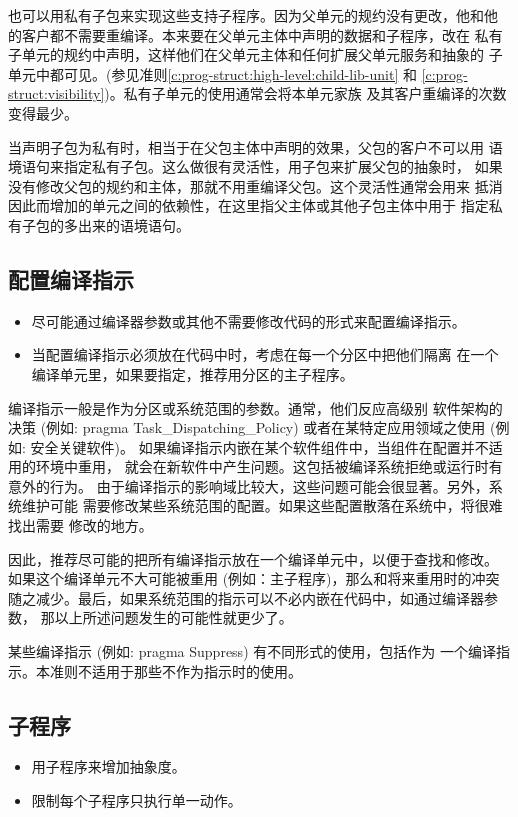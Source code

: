 \begin{blockindent}
也可以用私有子包来实现这些支持子程序。因为父单元的规约没有更改，他和他
的客户都不需要重编译。本来要在父单元主体中声明的数据和子程序，改在
私有子单元的规约中声明，这样他们在父单元主体和任何扩展父单元服务和抽象的
子单元中都可见。(参见准则\ref{c:prog-struct:high-level:child-lib-unit} 和
\ref{c:prog-struct:visibility})。私有子单元的使用通常会将本单元家族
及其客户重编译的次数变得最少。

当声明子包为私有时，相当于在父包主体中声明的效果，父包的客户不可以用
语境语句来指定私有子包。这么做很有灵活性，用子包来扩展父包的抽象时，
如果没有修改父包的规约和主体，那就不用重编译父包。这个灵活性通常会用来
抵消因此而增加的单元之间的依赖性，在这里指父主体或其他子包主体中用于
指定私有子包的多出来的语境语句。
\end{blockindent}

\subsection{配置编译指示}
\begin{itemize}
    \item 尽可能通过编译器参数或其他不需要修改代码的形式来配置编译指示。
    \item 当配置编译指示必须放在代码中时，考虑在每一个分区中把他们隔离
在一个编译单元里，如果要指定，推荐用分区的主子程序。
\end{itemize}

\begin{blockindent}
编译指示一般是作为分区或系统范围的参数。通常，他们反应高级别
软件架构的决策 (例如: pragma Task\_Dispatching\_Policy)
或者在某特定应用领域之使用 (例如: 安全关键软件)。
如果编译指示内嵌在某个软件组件中，当组件在配置并不适用的环境中重用，
就会在新软件中产生问题。这包括被编译系统拒绝或运行时有意外的行为。
由于编译指示的影响域比较大，这些问题可能会很显著。另外，系统维护可能
需要修改某些系统范围的配置。如果这些配置散落在系统中，将很难找出需要
修改的地方。

因此，推荐尽可能的把所有编译指示放在一个编译单元中，以便于查找和修改。
如果这个编译单元不大可能被重用 (例如：主子程序)，那么和将来重用时的冲突
随之减少。最后，如果系统范围的指示可以不必内嵌在代码中，如通过编译器参数，
那以上所述问题发生的可能性就更少了。
\end{blockindent}

某些编译指示 (例如: pragma Suppress) 有不同形式的使用，包括作为
一个编译指示。本准则不适用于那些不作为指示时的使用。

\subsection{子程序}
\begin{itemize}
\item 用子程序来增加抽象度。
\item 限制每个子程序只执行单一动作。
\end{itemize}

